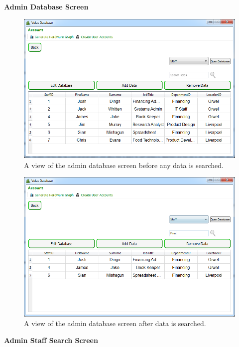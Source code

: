 \textbf{Admin Database Screen}

\begin{figure}[H]
    \includegraphics[width=\textwidth]{./Evaluation/Images/beforeadminsearch.png}
    \caption{A view of the admin database screen before any data is searched.} 
\end{figure}


\begin{figure}[H]
    \includegraphics[width=\textwidth]{./Evaluation/Images/afteradminsearch.png}
    \caption{A view of the admin database screen after data is searched.} 
\end{figure}

\textbf{Admin Staff Search Screen}

